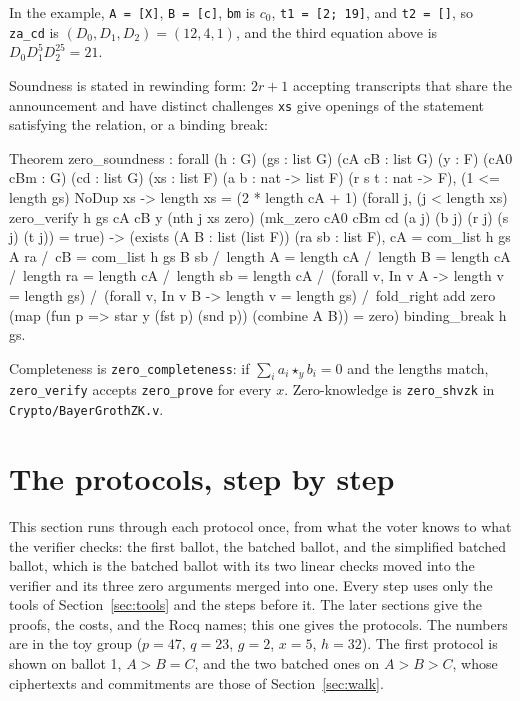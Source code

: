 \documentclass[11pt,a4paper]{article}
\newcommand{\rocq}[1]{\texttt{#1}}
\theoremstyle{remark}
\begin{document}
In the example, \rocq{A = [X]}, \rocq{B = [c]}, \rocq{bm} is $c_0$,
\rocq{t1 = [2; 19]}, and \rocq{t2 = []}, so \rocq{za\_cd} is $(D_0, D_1,
D_2) = (12, 4, 1)$, and the third equation above is $D_0 D_1^{5}
D_2^{25} = 21$.

Soundness is stated in rewinding form: $2r + 1$ accepting transcripts that
share the announcement and have distinct challenges \rocq{xs} give openings
of the statement satisfying the relation, or a binding break:
\begin{coq}
Theorem zero_soundness : forall (h : G) (gs : list G) (cA cB : list G) (y : F)
  (cA0 cBm : G) (cd : list G) (xs : list F) (a b : nat -> list F) (r s t : nat -> F),
  (1 <= length gs)%
  NoDup xs -> length xs = (2 * length cA + 1)%
  (forall j, (j < length xs)%
    zero_verify h gs cA cB y (nth j xs zero)
      (mk_zero cA0 cBm cd (a j) (b j) (r j) (s j) (t j)) = true) ->
  (exists (A B : list (list F)) (ra sb : list F),
    cA = com_list h gs A ra /\ cB = com_list h gs B sb /\
    length A = length cA /\ length B = length cA /\
    length ra = length cA /\ length sb = length cA /\
    (forall v, In v A -> length v = length gs) /\
    (forall v, In v B -> length v = length gs) /\
    fold_right add zero (map (fun p => star y (fst p) (snd p)) (combine A B)) = zero)
  \/ binding_break h gs.
\end{coq}
Completeness is \rocq{zero\_completeness}: if $\sum_i a_i \star_y b_i = 0$
and the lengths match, \rocq{zero\_verify} accepts \rocq{zero\_prove} for
every $x$. Zero-knowledge is \rocq{zero\_shvzk} in
\rocq{Crypto/BayerGrothZK.v}.

\section{The protocols, step by step}\label{sec:steps}
This section runs through each protocol once, from what the voter knows
to what the verifier checks: the first ballot, the batched ballot, and
the simplified batched ballot, which is the batched ballot with its two
linear checks moved into the verifier and its three zero arguments merged
into one. Every step uses only the tools of
Section~\ref{sec:tools} and the steps before it. The later sections give
the proofs, the costs, and the Rocq names; this one gives the protocols.
The numbers are in the toy group ($p = 47$, $q = 23$, $g = 2$, $x = 5$, $h
= 32$). The first protocol is shown on ballot 1, $A > B = C$, and the two
batched ones on $A > B > C$, whose ciphertexts and commitments are those of
Section~\ref{sec:walk}.
\end{document}
